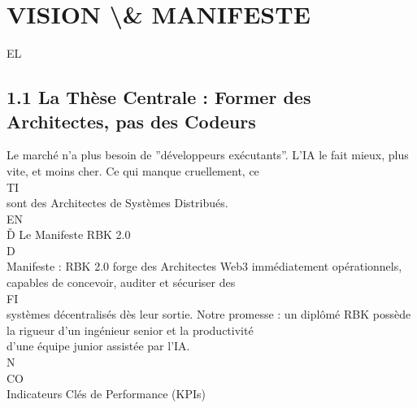 \section{VISION \textbackslash{}& MANIFESTE}
\vspace{0.5em}
\vspace{0.5em}
\vspace{0.5em}
\vspace{0.5em}
EL\\
\subsection{1.1 La Thèse Centrale : Former des Architectes, pas des Codeurs}
Le marché n’a plus besoin de ”développeurs exécutants”. L’IA le fait mieux, plus vite, et moins cher. Ce qui manque cruellement, ce\\
\vspace{0.5em}
\vspace{0.5em}
\vspace{0.5em}
\vspace{0.5em}
TI\\
sont des Architectes de Systèmes Distribués.\\
\vspace{0.5em}
\vspace{0.5em}
\vspace{0.5em}
\vspace{0.5em}
EN\\
Ď Le Manifeste RBK 2.0\\
\vspace{0.5em}
\vspace{0.5em}
\vspace{0.5em}
D\\
Manifeste : RBK 2.0 forge des Architectes Web3 immédiatement opérationnels, capables de concevoir, auditer et sécuriser des\\
\vspace{0.5em}
\vspace{0.5em}
\vspace{0.5em}
\vspace{0.5em}
FI\\
systèmes décentralisés dès leur sortie. Notre promesse : un diplômé RBK possède la rigueur d’un ingénieur senior et la productivité\\
d’une équipe junior assistée par l’IA.\\
N\\
CO\\
Indicateurs Clés de Performance (KPIs)\\
